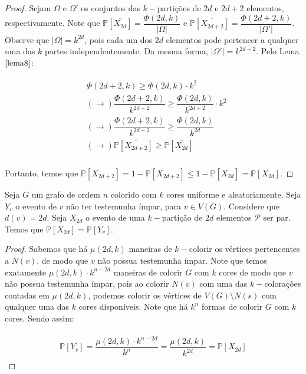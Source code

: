 \documentclass[12pt]{article}
\begin{document}
  \begin{proof} 
  	
  		Sejam $\Omega$ e $\Omega'$ os conjuntos das $k-$partições de $2d$ e $2d+2$ elementos, respectivamente. Note que $\mathds{P}[\overbar{X_{2d}}] = \dfrac{\Phi(2d, k)}{|\Omega|}$ e $\mathds{P}[\overbar{X_{2d+2}}] = \dfrac{\Phi(2d+2, k)}{|\Omega'|}$. Observe que $|\Omega| = k^{2d}$, pois cada um dos $2d$ elementos pode pertencer a qualquer uma das $k$ partes independentemente. Da mesma forma, $|\Omega'| = k^{2d + 2}$. Pelo Lema $\ref{lema8}$:
  	
  	\begin{align}
  		\begin{split}
  		  &	\Phi(2d+2, k) \geq \Phi(2d, k) {\cdot} k^2 \\
  		  & (\rightarrow) \dfrac{\Phi(2d+2, k)}{k^{2d+2}}	 \geq \dfrac{\Phi(2d, k)}{k^{2d+2}}	 {\cdot} k^2 \\
  		  & (\rightarrow) \dfrac{\Phi(2d+2, k)}{k^{2d+2}}	 \geq \dfrac{\Phi(2d, k)}{k^{2d}}\\
  		  & (\rightarrow) \mathds{P}[\overbar{X_{2d+2}}] \geq \mathds{P}[\overbar{X_{2d}}]\\
  		\end{split} 
  	\end{align}
  	
  	 Portanto, temos que $\mathds{P}[{X_{2d+2}}] = 1 - \mathds{P}[\overbar{X_{2d+2}}] \leq 1 - \mathds{P}[\overbar{X_{2d}}] = \mathds{P}[{X_{2d}}]$.
  	
  \end{proof}\newl 
 
 \begin{lema}  
 	\label{lema10} 
 	Seja $G$ um grafo de ordem $n$ colorido com $k$ cores uniforme e aleatoriamente. Seja $Y_{v}$ o evento de $v$ não ter testemunha ímpar, para $v \in V(G)$. Considere que $d(v) = 2d$. Seja $X_{2d}$ o evento de uma $k-$partição de $2d$ elementos $\mathcal{P}$ ser par.  Temos que $\mathds{P}[X_{2d}] = \mathds{P}[Y_v]$.
 \end{lema}
 
 \begin{proof}
 	Sabemos que há $\mu(2d, k)$ maneiras de $k-$colorir os vértices pertencentes a $N(v)$, de modo que $v$ não possua testemunha ímpar. Note que temos exatamente $\mu(2d, k) {\cdot} k^{n - 2d}$ maneiras de colorir $G$ com $k$ cores de modo que $v$ não possua testemunha ímpar, pois ao colorir $N(v)$ com uma das $k-$colorações contadas em $\mu(2d, k)$, podemos colorir os vértices de $V(G)\setminus N(s)$ com qualquer uma das $k$ cores disponíveis. Note que há $k^n$ formas de colorir $G$ com $k$ cores. Sendo assim: 
 	
 	\begin{align}
 		\begin{split}
 			 \mathds{P}[Y_v] = \dfrac{\mu(2d, k) {\cdot} k^{n - 2d}}{k^n} = \dfrac{\mu(2d, k)}{k^{2d}} = \mathds{P}[X_{2d}]
 		\end{split} 
 	\end{align}
 	
 \end{proof}
 
\end{document}
